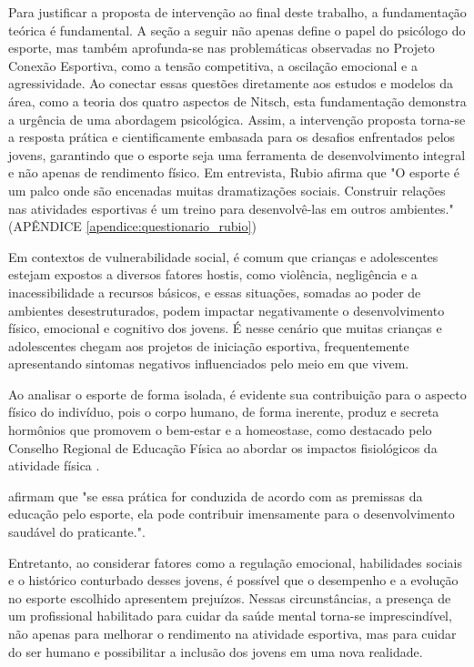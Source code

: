 \begin{Desenvolvimento}
Para justificar a proposta de intervenção ao final deste trabalho, a fundamentação teórica é fundamental. A seção a seguir não apenas define o papel do psicólogo do esporte, mas também aprofunda-se nas problemáticas observadas no Projeto Conexão Esportiva, como a tensão competitiva, a oscilação emocional e a agressividade. Ao conectar essas questões diretamente aos estudos e modelos da área, como a teoria dos quatro aspectos de Nitsch, esta fundamentação demonstra a urgência de uma abordagem psicológica. Assim, a intervenção proposta torna-se a resposta prática e cientificamente embasada para os desafios enfrentados pelos jovens, garantindo que o esporte seja uma ferramenta de desenvolvimento integral e não apenas de rendimento físico.
Em entrevista, Rubio afirma que "O esporte é um palco onde são encenadas muitas dramatizações sociais. Construir relações nas atividades esportivas é um treino para desenvolvê-las em outros ambientes." (APÊNDICE \ref{apendice:questionario_rubio})

Em contextos de vulnerabilidade social, é comum que crianças e adolescentes estejam expostos a diversos fatores hostis, como violência, negligência e a inacessibilidade a recursos básicos, e essas situações, somadas ao poder de ambientes desestruturados, podem impactar negativamente o desenvolvimento físico, emocional e cognitivo dos jovens. É nesse cenário que muitas crianças e adolescentes chegam aos projetos de iniciação esportiva, frequentemente apresentando sintomas negativos influenciados pelo meio em que vivem.

Ao analisar o esporte de forma isolada, é evidente sua contribuição para o aspecto físico do indivíduo, pois o corpo humano, de forma inerente, produz e secreta hormônios que promovem o bem-estar e a homeostase, como destacado pelo Conselho Regional de Educação Física ao abordar os impactos fisiológicos da atividade física .

 afirmam que "se essa prática for conduzida de acordo com as premissas da educação pelo esporte, ela pode contribuir imensamente para o desenvolvimento saudável do praticante.".

Entretanto, ao considerar fatores como a regulação emocional, habilidades sociais e o histórico conturbado desses jovens, é possível que o desempenho e a evolução no esporte escolhido apresentem prejuízos. Nessas circunstâncias, a presença de um profissional habilitado para cuidar da saúde mental torna-se imprescindível, não apenas para melhorar o rendimento na atividade esportiva, mas para cuidar do ser humano e possibilitar a inclusão dos jovens em uma nova realidade.


\end{Desenvolvimento}
